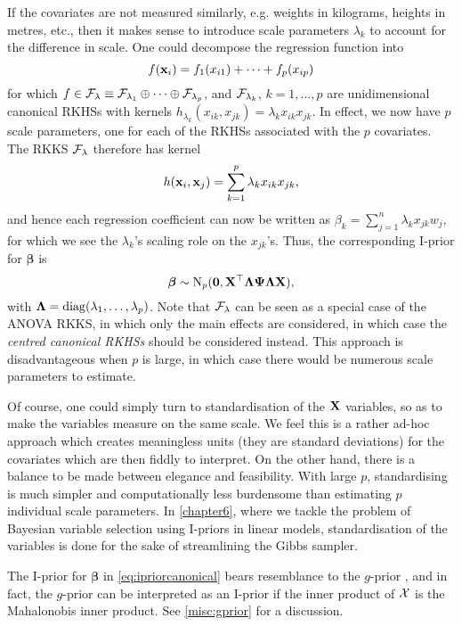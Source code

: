 If the covariates are not measured similarly, e.g. weights in kilograms, heights in metres, etc., then it makes sense to introduce scale parameters $\lambda_k$ to account for the difference in scale.
One could decompose the regression function into
\[
  f({\mathbf x}_i) = f_1(x_{i1}) + \cdots + f_p(x_{ip}) 
\]
for which $f \in {\mathcal F}_\lambda \equiv {\mathcal F}_{\lambda_1}\oplus\cdots\oplus{\mathcal F}_{\lambda_p}$, and ${\mathcal F}_{\lambda_k}$, $k=1,\dots,p$ are unidimensional canonical RKHSs with kernels $h_{\lambda_k}(x_{ik},x_{jk}) = \lambda_k x_{ik} x_{jk}$.
In effect, we now have $p$ scale parameters, one for each of the RKHSs associated with the $p$ covariates.
The RKKS ${\mathcal F}_\lambda$ therefore has kernel
\[
  h({\mathbf x}_i,{\mathbf x}_j) = \sum_{k=1}^p \lambda_k  x_{ik} x_{jk},
\]
and hence each regression coefficient can now be written as $\beta_k =  \sum_{j=1}^n  \lambda_k x_{jk}w_j$, for which we see the $\lambda_k$'s scaling role on the $x_{jk}$'s.
Thus, the corresponding I-prior for $\boldsymbol{\beta}$ is
\[
  \boldsymbol{\beta} \sim \operatorname{N}_p({\mathbf 0}, {\mathbf X}^\top{\bm\Lambda} {\bm\Psi} {\bm\Lambda} {\mathbf X}),
\]
with ${\bm\Lambda} = \operatorname{diag}(\lambda_1,\dots,\lambda_p)$.
Note that ${\mathcal F}_\lambda$ can be seen as a special case of the ANOVA RKKS, in which only the main effects are considered, in which case the \emph{centred canonical RKHSs} should be considered instead.
This approach is disadvantageous when $p$ is large, in which case there would be numerous scale parameters to estimate.

\begin{remark}
  Of course, one could simply turn to standardisation of the ${\mathbf X}$ variables, so as to make the variables measure on the same scale.
  We feel this is a rather ad-hoc approach which creates meaningless units (they are standard deviations) for the covariates which are then fiddly to interpret.
  On the other hand, there is a balance to be made between elegance and feasibility.
  With large $p$, standardising is much simpler and computationally less burdensome than estimating $p$ individual scale parameters.
  In \cref{chapter6}, where we tackle the problem of  Bayesian variable selection using I-priors in linear models, standardisation of the variables is done for the sake of streamlining the Gibbs sampler.
\end{remark}


\begin{remark}
  The I-prior for $\boldsymbol{\beta}$ in \cref{eq:ipriorcanonical} bears resemblance to the $g$-prior \citep{zellner1986assessing}, and in fact, the $g$-prior can be interpreted as an I-prior if the inner product of ${\mathcal X}$ is the Mahalonobis inner product.
  See \cref{misc:gprior} for a discussion.
\end{remark}

